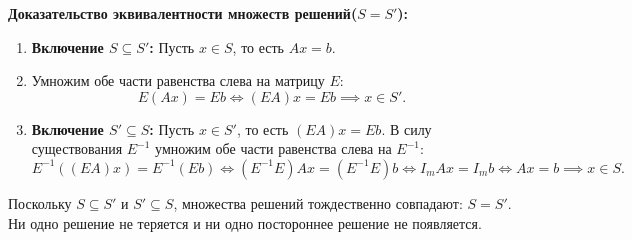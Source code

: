 \textbf{Доказательство эквивалентности множеств решений($S = S'$):}
\begin{enumerate}
    \item \textbf{Включение $S \subseteq S'$:} Пусть $x \in S$, то есть $Ax = b$.
    \item Умножим обе части равенства слева на матрицу $E$:
    \[ E(Ax) = Eb \iff (EA)x = Eb \implies x \in S'. \]
    \item \textbf{Включение $S' \subseteq S$:} Пусть $x \in S'$, то есть $(EA)x = Eb$.
    В силу существования $E^{-1}$ умножим обе части равенства слева на $E^{-1}$:
    \[ E^{-1} ((EA)x)=E^{-1} (Eb) \iff (E^{-1} E) Ax=(E^{-1} E) b \iff I_m Ax=I_m b \iff Ax = b \implies x \in S. \]
\end{enumerate}
Поскольку $S \subseteq S'$ и $S' \subseteq S$, множества решений тождественно совпадают: $S = S'$.
Ни одно решение не теряется и ни одно постороннее решение не появляется.

\newpage